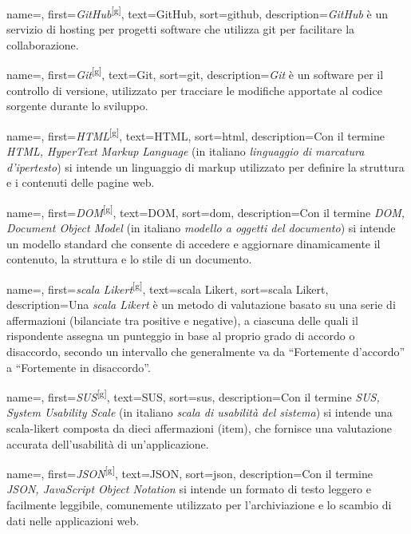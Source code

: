  {
    name=,
    first={\textit{GitHub}\textsuperscript{[g]}},
    text=GitHub,
    sort=github,
    description={\textit{GitHub} è un servizio di hosting per progetti software che utilizza \gls{git} per facilitare la collaborazione.}
}

 {
    name=,
    first={\textit{Git}\textsuperscript{[g]}},
    text=Git,
    sort=git,
    description={\textit{Git} è un software per il controllo di versione, utilizzato per tracciare le modifiche apportate al codice sorgente durante lo sviluppo.}
}

 {
    name=,
    first={\textit{HTML}\textsuperscript{[g]}},
    text=HTML,
    sort=html,
    description={Con il termine \textit{HTML, HyperText Markup Language} (in italiano \textit{linguaggio di marcatura d'ipertesto}) si intende un linguaggio di markup utilizzato per definire la struttura e i contenuti delle pagine web.}
}

 {
    name=,
    first={\textit{DOM}\textsuperscript{[g]}},
    text=DOM,
    sort=dom,
    description={Con il termine \textit{DOM, Document Object Model} (in italiano \textit{modello a oggetti del documento}) si intende un modello standard che consente di accedere e aggiornare dinamicamente il contenuto, la struttura e lo stile di un documento.}
}

 {
    name=,
    first={\textit{scala Likert}\textsuperscript{[g]}},
    text=scala Likert,
    sort=scala Likert,
    description={Una \textit{scala Likert} è un metodo di valutazione basato su una serie di affermazioni (bilanciate tra positive e negative), a ciascuna delle quali il rispondente assegna un punteggio in base al proprio grado di accordo o disaccordo, secondo un intervallo che generalmente va da “Fortemente d'accordo” a “Fortemente in disaccordo”.}
}

 {
    name=,
    first={\textit{SUS}\textsuperscript{[g]}},
    text=SUS,
    sort=sus,
    description={Con il termine \textit{SUS, System Usability Scale} (in italiano \textit{scala di usabilità del sistema}) si intende una \gls{scala-likert} composta da dieci affermazioni (item), che fornisce una valutazione accurata dell'usabilità di un'applicazione.}
}

 {
    name=,
    first={\textit{JSON}\textsuperscript{[g]}},
    text=JSON,
    sort=json,
    description={Con il termine \textit{JSON, JavaScript Object Notation} si intende un formato di testo leggero e facilmente leggibile, comunemente utilizzato per l’archiviazione e lo scambio di dati nelle applicazioni web.}
}

